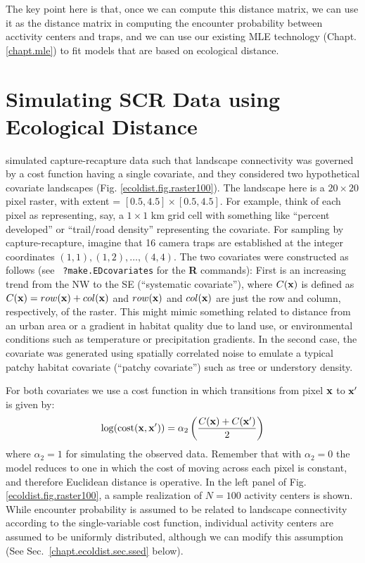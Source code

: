 The key point here is that, once we can compute this distance matrix,
we can use it as the distance matrix in computing the encounter
probability between acctivity centers and traps, and we can use our
existing MLE technology (Chapt. \ref{chapt.mle}) to fit models that
are based on ecological distance.



\section{Simulating SCR Data using Ecological Distance}
\label{ecoldist.sec.simulating}

\citet{royle_etal:2012ecol} simulated capture-recapture data
such that landscape connectivity was governed by %
a cost function having a
single covariate, and they considered two hypothetical covariate
landscapes
(Fig. \ref{ecoldist.fig.raster100}).
The landscape here is a $20 \times 20$ pixel raster, with
extent = $[0.5, 4.5] \times [0.5, 4.5]$.
For example, think of each pixel as
representing, say, a $1 \times 1$ km grid cell with something like
``percent developed'' or ``trail/road density'' representing the
covariate. For sampling by capture-recapture, imagine
that 16 camera traps are established at the integer coordinates
$(1,1), (1,2), \ldots, (4,4)$.
The two covariates were constructed as follows (see \mbox{\tt
  ?make.EDcovariates} for the {\bf R} commands):
First is an increasing trend from
the NW to the SE (``systematic covariate''), where $C({\bf x})$ is defined as
$C({\bf x}) = row({\bf x}) + col({\bf x})$ and $row({\bf x})$ and $col({\bf x})$ are just the row and
column, respectively, of the raster.  This might mimic something
related to distance from an urban area or a gradient in habitat
quality due to land use, or environmental conditions such as
temperature or precipitation gradients.  In the second case, the
covariate was generated using spatially correlated noise to
emulate a typical patchy habitat covariate (``patchy covariate'') such as
tree or understory density.

For both covariates we use a
cost function in which transitions from pixel ${\bf x}$ to ${\bf x}'$
is given by:
\[
 \log(\mbox{cost}({\bf x},{\bf x}'))=  \alpha_2 \left( \frac{C({\bf
       x}) + C({\bf x}')}{2} \right)
\]
where $\alpha_2 = 1$ for simulating the observed data.
 Remember that with $\alpha_2=0$ the
model reduces to one in which the cost of moving across each pixel is
constant, and therefore Euclidean distance is operative.
In the left panel of
Fig. \ref{ecoldist.fig.raster100}, a sample realization of
$N=100$ activity centers is shown. While encounter probability is
assumed to be related to landscape connectivity according to the
single-variable cost function, individual activity centers are
assumed to be uniformly distributed, although we can modify this
assumption (See Sec.~\ref{chapt.ecoldist.sec.ssed} below).


